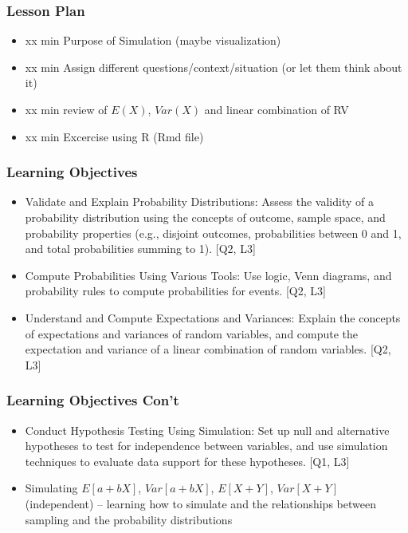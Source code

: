 

\begin{frame}
\frametitle{Lesson Plan}
\begin{itemize}
    \item xx min Purpose of Simulation (maybe visualization)
    \item xx min Assign different questions/context/situation (or let them think about it)
    \item xx min review of $E(X)$, $Var(X)$ and linear combination of RV
    \item xx min Excercise using R (Rmd file)
\end{itemize}
\end{frame}


\begin{frame}
\frametitle{Learning Objectives}

\begin{itemize}
    \item Validate and Explain Probability Distributions: Assess the validity of a probability distribution using the concepts of outcome, sample space, and probability properties (e.g., disjoint outcomes, probabilities between 0 and 1, and total probabilities summing to 1). [Q2, L3] 
    \item Compute Probabilities Using Various Tools: Use logic, Venn diagrams, and probability rules to compute probabilities for events. [Q2, L3] 
    \item Understand and Compute Expectations and Variances: Explain the concepts of expectations and variances of random variables, and compute the expectation and variance of a linear combination of random variables. [Q2, L3] 
\end{itemize}
\end{frame}


\begin{frame}
    \frametitle{Learning Objectives Con't}

    \begin{itemize}
        \item Conduct Hypothesis Testing Using Simulation: Set up null and alternative hypotheses to test for independence between variables, and use simulation techniques to evaluate data support for these hypotheses. [Q1, L3]
        \item Simulating $E[a+bX]$, $Var[a+bX]$, $E[X+Y]$, $Var[X+Y]$ (independent) -- learning how to simulate and the relationships between sampling and the probability distributions

    \end{itemize}
\end{frame}






